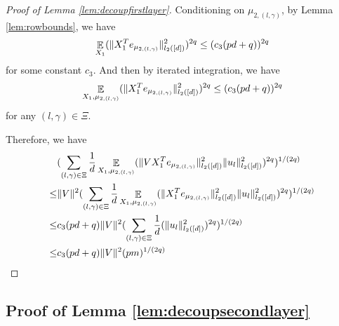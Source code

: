 \documentclass[11pt]{amsart}
\numberwithin{equation}{section}
\numberwithin{equation}{section}
\DeclareMathOperator{\E}{\mathbb{E}}
\DeclarePairedDelimiter{\norm}{\lVert}{\rVert}
\begin{document}
\begin{proof}[Proof of Lemma \ref{lem:decoupfirstlayer}]
Conditioning on $\mu_{2,(l,\gamma)}$, by Lemma \ref{lem:rowbounds}, we have
\begin{align*}
    \E_{X_1}(\norm{X_1^Te_{\mu_{2,(l,\gamma)}}}_{l_2([d])}^2)^{2q} \le (c_3(pd+q))^{2q}
\end{align*}
for some constant $c_3$. And then by iterated integration, we have
\begin{align*}
    \E_{X_1,\mu_{2,(l,\gamma)}}(\norm{X_1^Te_{\mu_{2,(l,\gamma)}}}_{l_2([d])}^2)^{2q} \le (c_3(pd+q))^{2q}
\end{align*}
for any $(l,\gamma) \in \Xi$.

Therefore, we have
\begin{align*}
    &(\sum\limits_{(l,\gamma) \in \Xi}\frac{1}{d}\E_{X_1,\mu_{2,(l,\gamma)}}(\norm{VX_1^Te_{\mu_{2,(l,\gamma)}}}_{l_2([d])}^2\norm{u_l}_{l_2([d])}^{2})^{2q})^{1/(2q)}
    \\ \le & \norm{V}^2(\sum\limits_{(l,\gamma) \in \Xi}\frac{1}{d}\E_{X_1,\mu_{2,(l,\gamma)}}(\norm{X_1^Te_{\mu_{2,(l,\gamma)}}}_{l_2([d])}^2\norm{u_l}_{l_2([d])}^{2})^{2q})^{1/(2q)}
    \\ \le & c_3(pd+q)\norm{V}^2(\sum\limits_{(l,\gamma) \in \Xi}\frac{1}{d}(\norm{u_l}_{l_2([d])}^{2})^{2q})^{1/(2q)}
    \\ \le & c_3(pd+q)\norm{V}^2(pm)^{1/(2q)}
\end{align*}













\end{proof}

\subsection{Proof of Lemma \ref{lem:decoupsecondlayer}}
\end{document}
